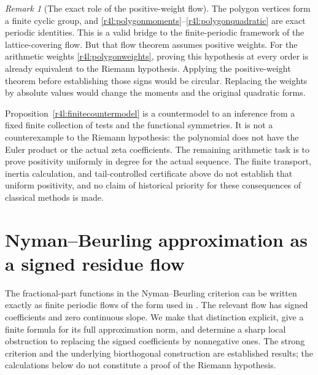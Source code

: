 \documentclass[11pt,a4paper]{article}
\theoremstyle{definition}\newtheorem{definition}[theorem]{Definition}
\theoremstyle{remark}\newtheorem{remark}[theorem]{Remark}
\numberwithin{equation}{section}
\begin{document}
\begin{remark}[The exact role of the positive-weight flow]
\label{r4l:flowgap}
The polygon vertices form a finite cyclic group, and
\eqref{r4l:polygonmoments}--\eqref{r4l:polygonquadratic} are exact
periodic identities.  This is a valid bridge to the finite-periodic
framework of the lattice-covering flow.  But that flow theorem
assumes positive weights.  For the arithmetic weights
\eqref{r4l:polygonweights}, proving this hypothesis at every order
is already equivalent to the Riemann hypothesis.  Applying the
positive-weight theorem before establishing those signs would be
circular.  Replacing the weights by absolute values would change the
moments and the original quadratic forms.

Proposition~\ref{r4l:finitecountermodel} is a countermodel to an
inference from a fixed finite collection of tests and the functional
symmetries.  It is not a counterexample to the Riemann hypothesis:
the polynomial does not have the Euler product or the actual zeta
coefficients.  The remaining arithmetic task is to prove positivity
uniformly in degree for the actual sequence.  The finite transport,
inertia calculation, and tail-controlled certificate above do not
establish that uniform positivity, and no claim of historical
priority for these consequences of classical methods is made.
\end{remark}


\section{Nyman--Beurling approximation as a signed residue flow}
\label{r4n:sec-nyman}

The fractional-part functions in the Nyman--Beurling criterion can be
written exactly as finite periodic flows of the form used in
\cite{VMRC200}.  The relevant flow has signed coefficients and zero
continuous slope.  We make that distinction explicit, give a finite
formula for its full approximation norm, and determine a sharp local
obstruction to replacing the signed coefficients by nonnegative ones.
The strong criterion and the underlying biorthogonal construction
are established results; the calculations below do not constitute a
proof of the Riemann hypothesis.
\end{document}
